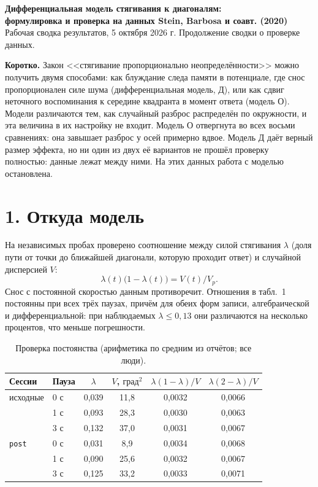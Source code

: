 \documentclass[10pt,a4paper]{article}
\newcommand{\dsq}{\text{град}^2}
\begin{document}
\begin{center}
{\Large\bfseries Дифференциальная модель стягивания к диагоналям:\\[2pt]
формулировка и проверка на данных Stein, Barbosa и соавт. (2020)}\\[6pt]
{\small Рабочая сводка результатов, 5 октября 2026 г. Продолжение сводки о проверке данных.}
\end{center}

\textbf{Коротко.} Закон <<стягивание пропорционально неопределённости>> можно получить двумя способами: как
блуждание следа памяти в потенциале, где снос пропорционален силе шума (дифференциальная модель, Д), или как сдвиг
неточного воспоминания к середине квадранта в момент ответа (модель О). Модели различаются тем, как случайный разброс
распределён по окружности, и эта величина в их настройку не входит. Модель О отвергнута во всех восьми сравнениях:
она завышает разброс у осей примерно вдвое. Модель Д даёт верный размер эффекта, но ни один из двух её вариантов не
прошёл проверку полностью: данные лежат между ними. На этих данных работа с моделью остановлена.

\section*{1. Откуда модель}

На независимых пробах проверено соотношение между силой стягивания $\lambda$ (доля пути от точки до ближайшей
диагонали, которую проходит ответ) и случайной дисперсией $V$:
\begin{equation}
\lambda(t)\bigl(1-\lambda(t)\bigr)=V(t)/V_p .
\label{eq:law}
\end{equation}
Снос с постоянной скоростью данным противоречит. Отношения в табл.~1 постоянны при всех трёх паузах, причём для обеих
форм записи, алгебраической и дифференциальной: при наблюдаемых $\lambda\le 0{,}13$ они различаются на несколько
процентов, что меньше погрешности.

\begin{table}[H]\centering\small
\caption{Проверка постоянства (арифметика по средним из отчётов; все люди).}
\begin{tabular}{llcccc}\toprule
Сессии & Пауза & $\lambda$ & $V$, $\dsq$ & $\lambda(1-\lambda)/V$ & $\lambda(2-\lambda)/V$\\\midrule
исходные & 0 с & 0,039 & 11,8 & 0,0032 & 0,0066\\
 & 1 с & 0,093 & 28,3 & 0,0030 & 0,0063\\
 & 3 с & 0,132 & 37,0 & 0,0031 & 0,0067\\\addlinespace
\texttt{post} & 0 с & 0,031 & 8,9 & 0,0034 & 0,0068\\
 & 1 с & 0,090 & 25,6 & 0,0032 & 0,0067\\
 & 3 с & 0,125 & 33,2 & 0,0033 & 0,0071\\\bottomrule
\end{tabular}
\end{table}
\end{document}
